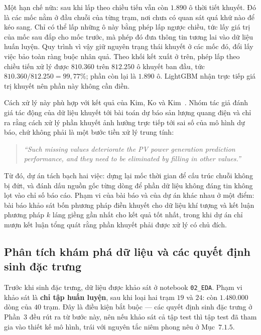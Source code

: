Một hạn chế nữa: sau khi lấp theo chiều tiến vẫn còn $1.890$ ô thời tiết khuyết. Đó là các mốc
nằm ở đầu chuỗi của từng trạm, nơi chưa có quan sát quá khứ nào để kéo sang. Chỉ có thể lấp
những ô này bằng phép lấp ngược chiều, tức lấy giá trị của mốc sau đắp cho mốc trước, mà phép đó
đưa thông tin tương lai vào dữ liệu huấn luyện. Quy trình vì vậy giữ nguyên trạng thái khuyết
ở các mốc đó, đổi lấy việc bảo toàn ràng buộc nhân quả. Theo khối kết xuất ở trên, phép lấp
theo chiều tiến xử lý được $810.360$ trên $812.250$ ô khuyết ban đầu, tức
$810.360 / 812.250 = 99{,}77\%$; phần còn lại là $1.890$ ô. LightGBM nhận trực tiếp giá trị
khuyết nên phần này không cần điền.

Cách xử lý này phù hợp với kết quả của Kim, Ko và Kim~\cite{kim2019missing}. Nhóm tác
giả đánh giá tác động của dữ liệu khuyết tới bài toán dự báo sản lượng quang điện và
chỉ ra rằng cách xử lý phần khuyết ảnh hưởng trực tiếp tới sai số của mô hình dự báo,
chứ không phải là một bước tiền xử lý trung tính:

\begin{quote}\small
\textit{``Such missing values deteriorate the PV power generation prediction performance, and they need to be eliminated by filling in other values.''}
\end{quote}


Từ đó, dự án tách bạch hai việc: dựng lại mốc thời gian để cấu trúc chuỗi
không bị đứt, và đánh dấu nguồn gốc từng dòng để phần dữ liệu không đáng tin
không lọt vào chỉ số báo cáo. Phạm vi của bài báo và của dự án khác nhau ở một điểm: bài báo khảo
sát bốn phương pháp điền khuyết cho dữ liệu khí tượng và kết luận phương pháp
$k$ láng giềng gần nhất cho kết quả tốt nhất, trong khi dự án chỉ mượn kết luận tổng
quát rằng phần khuyết phải được xử lý có chủ đích.

\FloatBarrier
\subsection{Phân tích khám phá dữ liệu và các quyết định sinh đặc trưng}

Trước khi sinh đặc trưng, dữ liệu được khảo sát ở notebook \texttt{02\_EDA}. Phạm vi khảo sát là
\textbf{chỉ tập huấn luyện}, sau khi loại hai trạm $19$ và $24$: còn $1.480.000$ dòng của
$40$ trạm. Đây là điều kiện bắt buộc --- các quyết định sinh đặc trưng ở Phần~$3$ đều rút ra
từ bước này, nên nếu khảo sát cả tập test thì tập test đã tham gia vào thiết kế mô hình,
trái với nguyên tắc niêm phong nêu ở Mục~$7.1.5$.

